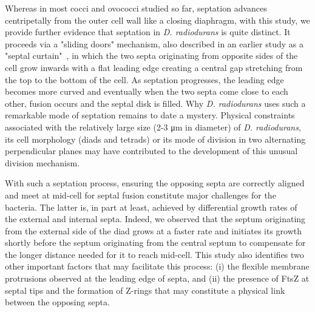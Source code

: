 Whereas in most cocci and ovococci studied so far, septation advances centripetally from the outer cell wall like a closing diaphragm, with this study, we provide further evidence that septation in \textit{D. radiodurans} is quite distinct.
It proceeds via a "sliding doors" mechanism, also described in an earlier study as a "septal curtain"~\cite{murrayCellDivisionDeinococcus1983}, in which the two septa originating from opposite sides of the cell grow inwards with a flat leading edge creating a central gap stretching from the top to the bottom of the cell.
As septation progresses, the leading edge becomes more curved and eventually when the two septa come close to each other, fusion occurs and the septal disk is filled.
Why \textit{D. radiodurans} uses such a remarkable mode of septation remains to date a mystery.
Physical constraints associated with the relatively large size (2-3 μm in diameter) of \textit{D. radiodurans}, its cell morphology (diads and tetrads) or its mode of division in two alternating perpendicular planes may have contributed to the development of this unusual division mechanism.

With such a septation process, ensuring the opposing septa are correctly aligned and meet at mid-cell for septal fusion constitute major challenges for the bacteria.
The latter is, in part at least, achieved by differential growth rates of the external and internal septa.
Indeed, we observed that the septum originating from the external side of the diad grows at a faster rate and initiates its growth shortly before the septum originating from the central septum to compensate for the longer distance needed for it to reach mid-cell.
This study also identifies two other important factors that may facilitate this process: (i) the flexible membrane protrusions observed at the leading edge of septa, and (ii) the presence of FtsZ at septal tips and the formation of Z-rings that may constitute a physical link between the opposing septa.

